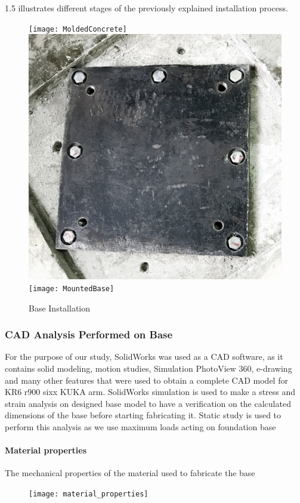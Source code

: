 \figurename{1.5} illustrates different stages of the previously explained installation process.

\begin{figure}[H]
\begin{center}
\texttt{[image: MoldedConcrete]}	
\includegraphics[scale=0.08]{FirstFlange}
\texttt{[image: MountedBase]}
\caption{Base Installation}
\end{center}
\end{figure}



\newpage
\subsubsection{CAD Analysis Performed on Base}
For the purpose of our study, SolidWorks was used as a CAD software, as it contains solid modeling, motion studies, Simulation PhotoView 360, e-drawing and many other features that were used to obtain a complete CAD model for KR6 r900 sixx KUKA arm. 
\newline SolidWorks simulation is used to make a stress and strain analysis on designed base model to have a verification on the calculated dimensions of the base before starting fabricating it. Static study is used to perform this analysis as we use maximum loads acting on foundation base 

\paragraph{Material properties}
The mechanical properties of the material used to fabricate the base
\begin{figure}[H]
	\centering
	\texttt{[image: material\_properties]}
\end{figure}


